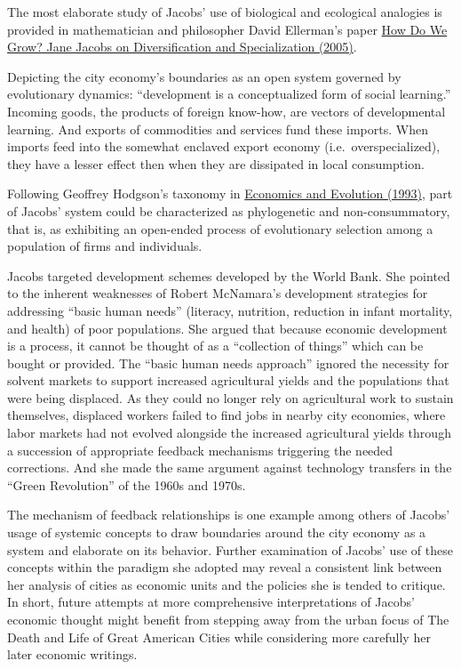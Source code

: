 \documentclass[
]{book}
\begin{document}
The most elaborate study of Jacobs' use of biological and ecological analogies is provided in mathematician and philosopher David Ellerman's paper \href{http://www.ellerman.org/how-do-we-grow-jane-jacobs-on-diversification-and-specialization/}{How Do We Grow? Jane Jacobs on Diversification and Specialization (2005)}.

Depicting the city economy's boundaries as an open system governed by evolutionary dynamics:
``development is a conceptualized form of social learning.''
Incoming goods, the products of foreign know-how, are vectors of developmental learning.
And exports of commodities and services fund these imports.
When imports feed into the somewhat enclaved export economy (i.e.~overspecialized),
they have a lesser effect then when they are dissipated in local consumption.

Following Geoffrey Hodgson's taxonomy in
\href{https://www.press.umich.edu/14006/economics_and_evolution}{Economics and Evolution (1993)},
part of Jacobs' system could be characterized as phylogenetic and non-consummatory,
that is, as exhibiting an open-ended process of evolutionary selection
among a population of firms and individuals.

Jacobs targeted development schemes developed by the World Bank. She pointed to the inherent weaknesses of Robert McNamara's development strategies for addressing ``basic human needs'' (literacy, nutrition, reduction in infant mortality, and health) of poor populations. She argued that because economic development is a process, it cannot be thought of as a ``collection of things'' which can be bought or provided. The ``basic human needs approach'' ignored the necessity for solvent markets to support increased agricultural yields and the populations that were being displaced. As they could no longer rely on agricultural work to sustain themselves, displaced workers failed to find jobs in nearby city economies, where labor markets had not evolved alongside the increased agricultural yields through a succession of appropriate feedback mechanisms triggering the needed corrections. And she made the same argument against technology transfers in the ``Green Revolution'' of the 1960s and 1970s.

The mechanism of feedback relationships is one example among others of Jacobs' usage of systemic concepts to draw boundaries around the city economy as a system and elaborate on its behavior. Further examination of Jacobs' use of these concepts within the paradigm she adopted may reveal a consistent link between her analysis of cities as economic units and the policies she is tended to critique. In short, future attempts at more comprehensive interpretations of Jacobs' economic thought might benefit from stepping away from the urban focus of The Death and Life of Great American Cities while considering more carefully her later economic writings.
\end{document}
